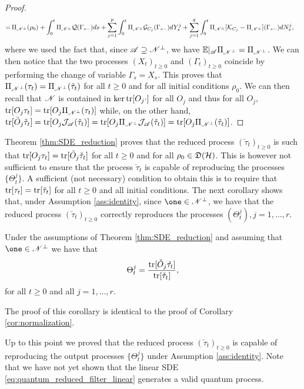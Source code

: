 \documentclass[aihp,12pt]{imsart}
\begin{document}
\begin{proof}
\begin{align*}
        =\,& \Pi_{\mathscr{N}^\perp}(\rho_0) + \int_{0}^t \Pi_{\mathscr{N}^\perp}{\mathcal{Q}} (\Gamma_{s-}) ds + \sum_{j=1}^p \int_{0}^t \Pi_{\mathscr{N}^\perp}{\mathcal{G}}_{C_j} (\Gamma_{s-}) dY_s^j 
        +\sum_{j=1}^q \int_{0}^t \Pi_{\mathscr{N}^\perp}[\mathcal{K}_{C_j}-\Pi_{\mathscr{N}^\perp}](\Gamma_{s-}) dN_s^j,
    \end{align*}
    where we used the fact that, since $\mathscr{A}\supseteq\mathscr{N}^\perp$, we have $\mathbb{E}|_{\mathscr{A}}\Pi_{\mathscr{N}^\perp} = \Pi_{\mathscr{N}^\perp}$. We can then notice that the two processes $(X_t)_{t\geq0}$ and $(\Gamma_t)_{t\geq0}$ coincide by performing the change of variable $\Gamma_s = X_s$. This proves that $\Pi_{\mathscr{N}^\perp}(\tau_t) = \Pi_{\mathscr{N}^\perp}(\Tilde{\tau}_t)$ for all $t\geq0$ and for all initial conditions $\rho_0$. We can then recall that $\mathscr{N}$ is contained in $\ker {\rm tr}[O_j \cdot]$ for all $O_j$ and thus for all $O_j$, ${\rm tr}[O_j \tau_t] = {\rm tr}[O_j \Pi_{\mathscr{N}^\perp}(\tau_t)]$ while, on the other hand, ${\rm tr}[\check{O}_j\check{\tau}_t] = {\rm tr}[O_j \mathcal{J}_{\mathscr{A}}(\check{\tau}_t)] = {\rm tr}[O_j \Pi_{\mathscr{N}^\perp}  \mathcal{J}_{\mathscr{A}}(\check{\tau}_t)] = {\rm tr}[O_j \Pi_{\mathscr{N}^\perp}(\Tilde{\tau}_t)]$.
\end{proof}

Theorem \ref{thm:SDE_reduction} proves that the reduced process $(\check{\tau}_t)_{t\geq0}$ is such that ${\rm tr}[O_j\tau_t] = {\rm tr}[\check{O}_j\check{\tau}_t]$ for all $t\geq0$ and for all $\rho_0\in\mathfrak{D}(\mathcal{H})$. This is however not sufficient to ensure that the process $\check{\tau}_t$ is capable of reproducing the processes $\{\Theta_t^j\}$. A sufficient (not necessary) condition to obtain this is to require that ${\rm tr}[\tau_t]={\rm tr}[\check{\tau}_t]$ for all $t\geq0$ and all initial conditions. The next corollary shows that, under Assumption \ref{ass:identity}, since $\one\in\Ns^\perp$, we have that the reduced process $(\check{\tau}_t)_{t\geq0}$ correctly reproduces the processes $(\Theta_t^j),j=1,\ldots,r$. 
\begin{corollary}
\label{cor:normalization_quantum}
    Under the assumptions of Theorem \ref{thm:SDE_reduction} and assuming that $\one\in\Ns^\perp$ we have that $$\Theta_t^j = \frac{{\rm tr}[\check{O}_j\check{\tau_t}]}{{\rm tr}[\check{\tau}_t]},$$ for all $t\geq0$ and all $j=1,\ldots,r$.
\end{corollary}
The proof of this corollary is identical to the proof of Corollary \ref{cor:normalization}.

Up to this point we proved that the reduced process $(\check{\tau}_t)_{t\geq0}$ is capable of reproducing the output processes $\{\Theta_t^j\}$ under Assumption \ref{ass:identity}. Note that we have not yet shown that the linear SDE \eqref{eq:quantum_reduced_filter_linear} generates a valid quantum process. 
\end{document}
